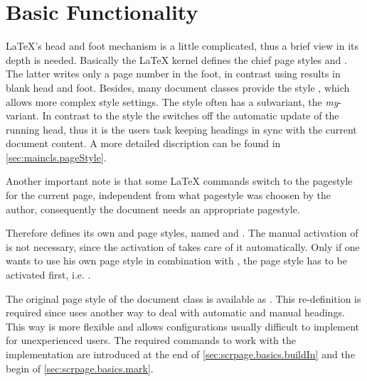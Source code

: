 \section{Basic Functionality}\label{sec:scrpage.basics}

\begin{Explain}%
  \LaTeX{}'s head and foot mechanism is a little complicated, thus a
  brief view in its depth is needed.
  Basically the \LaTeX{} kernel defines the chief page styles
   and .
  The latter writes only a page number in the foot, in contrast
  using  results in blank head and foot.
  Besides, many document classes provide the style
  , which allows more complex style settings.
  The  style often has a subvariant, the
  \emph{my}-variant. In contrast to the  style
  the  switches off the automatic update
  of the running head, thus it is the users task keeping headings
  in sync with the current document content.
  A more detailed discription can be found in
  \autoref{sec:maincls.pageStyle}.
  
  Another important note is that some \LaTeX{} commands
  switch to the pagestyle  for the current page,
  independent from what pagestyle was choosen by the author,
  consequently the document needs an appropriate 
   pagestyle.
  
  Therefore  defines its own 
  and  page styles, named 
  and .
  The manual activation of  is not necessary,
  since the activation of  takes care of it
  automatically.
  Only if one wants to use his own page style in combination
  with , the page style  has to
  be activated first, i.e. %
  .
\end{Explain}
  
The original  page style of the document class is available
as . This re-definition is required since
 uses another way to deal with automatic and manual
headings. This way is more flexible and allows configurations usually
difficult to implement for unexperienced users. The required commands to work
with the  implementation are introduced at the end of
\autoref{sec:scrpage.basics.buildIn} and the begin of
\autoref{sec:scrpage.basics.mark}.

